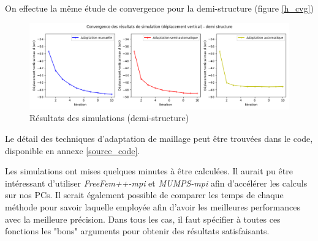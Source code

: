 \begin{solution}
\begin{figure}
\begin{center}
        \end{center}
    \end{figure}


    On effectue la même étude de convergence pour la demi-structure (figure \ref{h_cvg})

    \begin{figure}        
        \begin{center}
        
            \includegraphics[width=16.5cm]{imgs/cvgH.png}
            \caption{Résultats des simulations (demi-structure)}
            \label{fig:h_cvg}
        
        \end{center}
    \end{figure}

    Le détail des techniques d'adaptation de maillage peut être trouvées dans le code, disponible en annexe \ref{source_code}.


    Les simulations ont mises quelques minutes à être calculées. 
    Il aurait pu être intéressant d'utiliser \emph{FreeFem++-mpi} et \emph{MUMPS-mpi} afin d'accélérer les calculs sur nos PCs.
    Il serait également possible de comparer les temps de chaque méthode pour savoir laquelle employée afin d'avoir les meilleures performances avec la meilleure précision.
    Dans tous les cas, il faut spécifier à toutes ces fonctions les "bons" arguments pour obtenir des résultats satisfaisants.
\end{solution}





